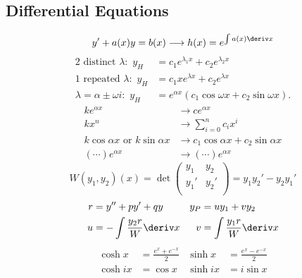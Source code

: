 \documentclass[10pt, a4paper]{article}
\begin{document}


\begin{landscape}
\begin{multicols}{3}

    \section{Differential Equations}

    \[y' + a(x) y = b(x) \longrightarrow h(x) = e^{\int a(x) \deriv x}\]
    \begin{align*}
        \text{2 distinct \(\lambda\):} \enspace y_{H} &= c_1 e^{\lambda_{1} x} + c_2 e^{\lambda_{2} x} \\
        \text{1 repeated \(\lambda\):} \enspace y_{H} &= c_1 x e^{\lambda x} + c_2 e ^{\lambda x} \\
        \lambda = \alpha \pm \omega i\text{:} \enspace y_{H} &= e^{\alpha x} \left(c_1 \cos \omega x + c_2 \sin \omega x\right).
    \end{align*}
    \begin{align*}
        k e^{\alpha x} &\longrightarrow ce^{\alpha x} \\
        k x^{n} &\longrightarrow \sum_{i=0}^{n} c_{i} x^{i} \\
        k \cos \alpha x \text{ or } k \sin \alpha x &\longrightarrow c_1 \cos \alpha x + c_2 \sin \alpha x \\
        \left(\cdots\right) e^{\alpha x} &\longrightarrow \left(\cdots\right) e^{\alpha x}
    \end{align*}
    \[W(y_1, y_2)(x) = \det \begin{pmatrix}
        y_1 & y_2 \\ 
        y_1' & y_2' \\ 
    \end{pmatrix} = y_1 y_2' - y_2 y_1'\]
    \begin{align*}
        r &= y'' + py' + qy & y_{P} &= uy_1 + vy_2 \\
        u &= - \int \frac{y_2 r}{W} \deriv x & v &= \int \frac{y_1 r}{W} \deriv x
    \end{align*}
    \begin{align*}
        \cosh x &= \frac{e^x + e^{-x}}{2} & \sinh x &= \frac{e^x - e^{-x}}{2} \\
        \cosh ix &= \cos x & \sinh ix &= i \sin x
    \end{align*}


\end{multicols}
\end{landscape}
\end{document}

